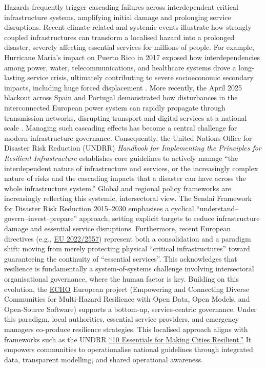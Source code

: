 \documentclass[review,12pt]{elsarticle}
\begin{document}
Hazards frequently trigger cascading failures across interdependent critical infrastructure systems, amplifying initial damage and prolonging service disruptions. Recent climate-related and systemic events illustrate how strongly coupled infrastructures can transform a localised hazard into a prolonged disaster, severely affecting essential services for millions of people. For example, Hurricane Maria's impact on Puerto Rico in 2017 exposed how interdependencies among power, water, telecommunications, and healthcare systems drove a long-lasting service crisis, ultimately contributing to severe socioeconomic secondary impacts, including huge forced displacement \cite{hurricane_maria, der_sarkissian_investigating_2022}. More recently, the April 2025 blackout across Spain and Portugal demonstrated how disturbances in the interconnected European power system can rapidly propagate through transmission networks, disrupting transport and digital services at a national scale \cite{panel2025grid}. Managing such cascading effects has become a central challenge for modern infrastructure governance. Consequently, the United Nations Office for Disaster Risk Reduction (UNDRR) \textit{Handbook for Implementing the Principles for Resilient Infrastructure} \cite{UNDRR2023Handbook} establishes core guidelines to actively manage ``the interdependent nature of infrastructure and services, or the increasingly complex nature of risks and the cascading impacts that a disaster can have across the whole infrastructure system.'' Global and regional policy frameworks are increasingly reflecting this systemic, intersectoral view. The Sendai Framework for Disaster Risk Reduction 2015--2030 emphasises a cyclical ``understand--govern--invest--prepare'' approach, setting explicit targets to reduce infrastructure damage and essential service disruptions. Furthermore, recent European directives (e.g., \href{https://eur-lex.europa.eu/eli/dir/2022/2557/}{EU 2022/2557}) represent both a consolidation and a paradigm shift: moving from merely protecting physical ``critical infrastructures'' toward guaranteeing the continuity of ``essential services''. This acknowledges that resilience is fundamentally a system-of-systems challenge involving intersectoral organisational governance, where the human factor is key. Building on this evolution, the \href{https://echo-horizon.eu/}{ECHO} European project (Empowering and Connecting Diverse Communities for Multi-Hazard Resilience with Open Data, Open Models, and Open-Source Software) supports a bottom-up, service-centric governance. Under this paradigm, local authorities, essential service providers, and emergency managers co-produce resilience strategies. This localised approach aligns with frameworks such as the UNDRR \href{https://www.preventionweb.net/publication/how-make-cities-more-resilient-handbook-local-government-leaders-2017#downloads}{``10 Essentials for Making Cities Resilient.''} It empowers communities to operationalise national guidelines through integrated data, transparent modelling, and shared operational awareness.
\end{document}
